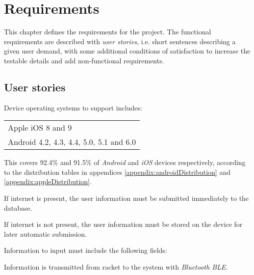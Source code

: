 \chapter{Requirements}\label{ch:Requirements}
This chapter defines the requirements for the project. 
The functional requirements are described with \textit{user stories}, i.e. short sentences describing a given user demand, with some additional conditions of satisfaction to increase the testable details and add non-functional requirements.

\section*{User stories}


Device operating systems to support includes: \newline
\begin{tabularx}{\textwidth}{X}
    Apple iOS 8 and 9 \\
    Android 4.2, 4.3, 4.4, 5.0, 5.1 and 6.0
\end{tabularx}

This covers 92.4\% and 91.5\% of \textit{Android} and \textit{iOS} devices respectively, according to the distribution tables in appendices \ref{appendix:androidDistribution} and \ref{appendix:appleDistribution}.


If internet is present, the user information must be submitted immediately to the database.

If internet is not present, the user information must be stored on the device for later automatic submission.

Information to input must include the following fields:\newline
{}


Information is transmitted from racket to the system with \textit{Bluetooth BLE}. 

